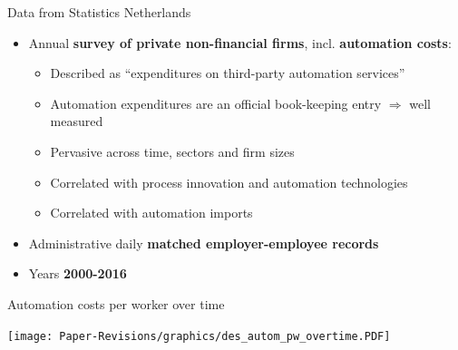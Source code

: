 \documentclass[aspectratio=169]{beamer}
\begin{document}
\begin{frame}{Data from Statistics Netherlands %
} \label{data}
\begin{itemize}
\item<1-> Annual \textbf{survey of private non-financial firms}, incl. \textbf{automation costs}:  \medskip
	\begin{itemize}
	\item Described as ``expenditures on third-party automation services'' \medskip
	\item Automation expenditures are an official book-keeping entry $\Rightarrow$ well measured \medskip
        \item Pervasive across time, sectors and firm sizes \medskip
        \item Correlated with process innovation and automation technologies \hyperlink{autom_innovation}{} \medskip
        \item Correlated with automation imports \hyperlink{sumstat_imports_sector}{} \medskip
	\end{itemize}
\item<2-> Administrative daily \textbf{matched employer-employee records} \hyperlink{data_cleaning}{} \medskip
\item<2-> Years \textbf{2000-2016} \medskip
\end{itemize} \medskip
\end{frame}

\begin{frame}{Automation costs per worker over time \hyperlink{des_autom}{}} \label{des_autom_time} 
\noindent \begin{center}
	\texttt{[image: Paper-Revisions/graphics/des\_autom\_pw\_overtime.PDF]}
	\end{center}
\footnotesize
\end{frame}
\end{document}
